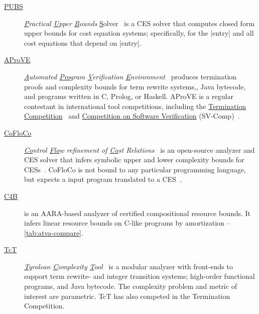\begin{description}

\item[\href{https://costa.fdi.ucm.es/~costa/pubs/pubs.php}{{PUBS}}]
      \emph{\underline{P}ractical \underline{U}pper \underline{B}ounds} \underline{S}olver~\cite{albert2010}
      is a CES solver that computes closed form upper bounds for cost equation systems;
      specifically, for the \pr|entry| and all cost equations that depend on \pr|entry|.

\item[\href{https://aprove.informatik.rwth-aachen.de}{{AProVE}}]
      \emph{\underline{A}utomated \underline{Pro}gram \underline{V}erification \underline{E}nvironment}~\cite{giesl2016}
      produces termination proofs and complexity bounds for
      term rewrite systems,,
      Java bytecode,
      and programs written in
      C,
      Prolog, or
      Haskell.
      AProVE is a regular contestant in international tool competitions, including the
      \href{https://termination-portal.org/wiki/Termination_Competition}{Termination Competition}~\cite{giesl2019}
      and \href{https://sv-comp.sosy-lab.org/}{Competition on Software Verification} (SV-Comp)~\cite{beyer2022}.

\item[\href{https://github.com/aeflores/CoFloCo}{{CoFloCo}}]
      \emph{\underline{Co}ntrol \underline{Flo}w refinement of \underline{Co}st Relations}~\cite{floresmontoya2014}
      is an open-source analyzer and CES solver that infers symbolic upper and lower complexity bounds for CESs~\cite{flores-montoya2016}.
      CoFloCo is not bound to any particular programming language, but expects a input program translated to a CES~\cite{flores2016}.

\item[\href{https://github.com/academic-archive/pldi15}{C4B}]\cite{carbonneaux2015}
      is an AARA-based analyzer of certified compositional resource bounds.
      It infers linear resource bounds on C-like programs by amortization -- \autoref{tab:atva-compare}.

\item[\href{http://cl-informatik.uibk.ac.at/software/tct/}{TcT}]
       \emph{\underline{T}yrolean \underline{C}omplexity \underline{T}ool}~\cite{avanzini2016}
       is a modular analyzer with front-ends to support term rewrite- and integer transition systems;
       high-order functional programs, and Java bytecode.
       The complexity problem and metric of interest are parametric.
       TcT has also competed in the Termination Competition.


\end{description}
